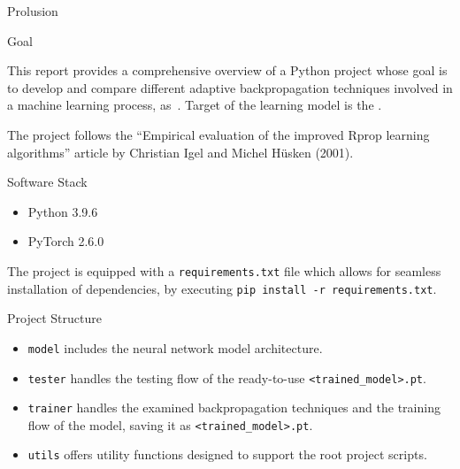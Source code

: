 \begin{chapter}{Prolusion}
    \begin{section}{Goal}
        \par This report provides a comprehensive overview of a Python project whose goal is to develop and compare different adaptive backpropagation techniques involved in a machine learning process, as~. Target of the learning model is the .
		\par The project follows the ``Empirical evaluation of the improved Rprop learning algorithms'' article by Christian Igel and Michel Hüsken (2001).
    \end{section}
    \newpage
	\begin{section}{Software Stack}
		\begin{itemize}
			\item Python 3.9.6
			\item PyTorch 2.6.0
		\end{itemize}
		The project is equipped with a \texttt{requirements.txt} file which allows for seamless installation of dependencies, by executing \texttt{pip install -r requirements.txt}.
	\end{section}
	\newpage
	\begin{section}{Project Structure}
		\medskip
		\begin{itemize}
			\item \texttt{model} includes the neural network model architecture.
			\item \texttt{tester} handles the testing flow of the ready-to-use \texttt{<trained\_model>.pt}.
			\item \texttt{trainer} handles the examined backpropagation techniques and the training flow of the model, saving it as \texttt{<trained\_model>.pt}.
			\item \texttt{utils} offers utility functions designed to support the root project scripts.
		\end{itemize}
	\end{section}
\end{chapter}